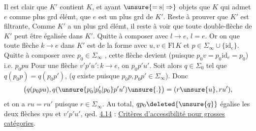 Il est clair que $K'$ contient $K$, et ayant $\unsure{=\mathrm{s}|\Rightarrow}$ objets que $K$ qui admet $e$ comme plus grd élémt, que $e$ est un plus grd  de $K'$. Reste à prouver que $K'$ est filtrante, Comme $K'$ a un plus grd élémt, il reste à voir  que toute double-flèche  de $K'$ peut être égalisée dans $K'$. Quitte à composer avec $l\longrightarrow e$,  $l=e$. Or on  que toute flèche $k\longrightarrow e$ dans $K'$ est de la forme
 avec $u,v\in\mathrm{Fl}\,K$ et $p\in\Sigma_\infty\cup\{\mathrm{id}_e\}$. Quitte à composer avec $p_0\in\Sigma_\infty$ , cette  flèche devient (puisque $p_0v=p_0\mathrm{id}_e=p_0$)
 i.e. $p_0pu$  Pour une flèche $v'p'u':k\longrightarrow e$, on  $p_0p'u'$. Soit alors $q\in\Sigma_0$ tel que $q(p_0p)=q(p_0p')$,  ($q$ existe puisque $p_0p,p_0p'\in\Sigma_\infty$). Donc
\[
\big(q(p_0pu),q(\unsure{p_0^{.}|p_0'|p_0}p'u')\unsure{.}\big)=(r\unsure{u},ru'),
\]
et on a $ru=ru'$ puisque $r\in\Sigma_\infty$. Au total, $qp_0\deleted{\unsure{q}}$ égalise les deux flèches $vpu$ et $v'p'u'$, qed.
\uline{4.14} : \uline{Critères d'accessibilité pour grosses catégories}.

